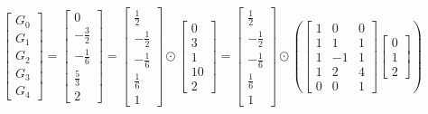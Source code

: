 \documentclass{article}%
\begin{document}
\[%
\left[\begin{matrix}G_{0}\\G_{1}\\G_{2}\\G_{3}\\G_{4}\end{matrix}\right] = \left[\begin{matrix}0\\- \frac{3}{2}\\- \frac{1}{6}\\\frac{5}{3}\\2\end{matrix}\right] = \left[\begin{matrix}\frac{1}{2}\\- \frac{1}{2}\\- \frac{1}{6}\\\frac{1}{6}\\1\end{matrix}\right] \odot \left[\begin{matrix}0\\3\\1\\10\\2\end{matrix}\right] = \left[\begin{matrix}\frac{1}{2}\\- \frac{1}{2}\\- \frac{1}{6}\\\frac{1}{6}\\1\end{matrix}\right] \odot \left( \left[\begin{matrix}1 & 0 & 0\\1 & 1 & 1\\1 & -1 & 1\\1 & 2 & 4\\0 & 0 & 1\end{matrix}\right] \left[\begin{matrix}0\\1\\2\end{matrix}\right] \right)%
\]%
\end{document}
